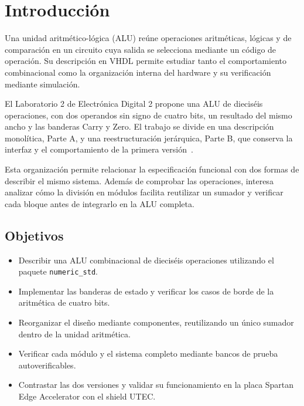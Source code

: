 \section{Introducción}

Una unidad aritmético-lógica (ALU) reúne operaciones aritméticas,
lógicas y de comparación en un circuito cuya salida se selecciona
mediante un código de operación. Su descripción en VHDL permite
estudiar tanto el comportamiento combinacional como la organización
interna del hardware y su verificación mediante simulación.

El Laboratorio 2 de Electrónica Digital 2 propone una ALU de
dieciséis operaciones, con dos operandos sin signo de cuatro bits,
un resultado del mismo ancho y las banderas Carry y Zero. El trabajo
se divide en una descripción monolítica, Parte A, y una
reestructuración jerárquica, Parte B, que conserva la interfaz y el
comportamiento de la primera versión~\cite{guialab2}.

Esta organización permite relacionar la especificación funcional
con dos formas de describir el mismo sistema. Además de comprobar
las operaciones, interesa analizar cómo la división en módulos
facilita reutilizar un sumador y verificar cada bloque antes de
integrarlo en la ALU completa.

\subsection{Objetivos}
\begin{itemize}
\item Describir una ALU combinacional de dieciséis operaciones
utilizando el paquete \texttt{numeric\_std}.
\item Implementar las banderas de estado y verificar los casos de
borde de la aritmética de cuatro bits.
\item Reorganizar el diseño mediante componentes, reutilizando un
único sumador dentro de la unidad aritmética.
\item Verificar cada módulo y el sistema completo mediante bancos
de prueba autoverificables.
\item Contrastar las dos versiones y validar su funcionamiento en
la placa Spartan Edge Accelerator con el shield UTEC.
\end{itemize}
